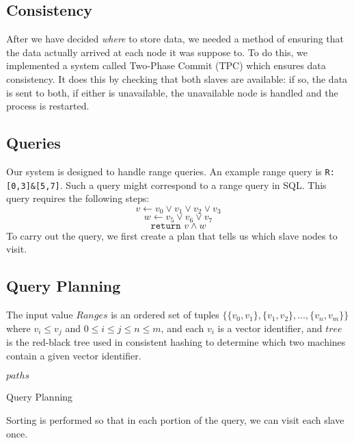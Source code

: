 \subsection{Consistency}
After we have decided \emph{where} to store data, we needed a method of ensuring that the data actually arrived at each node it was suppose to.
To do this, we implemented a system called Two-Phase Commit (TPC) which ensures data consistency.
It does this by checking that both slaves are available: if so, the data is sent to both, if either is unavailable, the unavailable node is handled and the process is restarted.
%
\subsection{Queries}
Our system is designed to handle range queries. An example range query is
\texttt{R:[0,3]\&[5,7]}. Such a query might correspond to a range query in SQL.
This query requires the following steps:
$$
v\gets v_0 \lor v_1 \lor v_2 \lor v_3 $$ $$
w\gets v_5 \lor v_6 \lor v_7 $$ $$
\texttt{return }  v \land w
$$
To carry out the query, we first create a plan that tells us which slave nodes
to visit.
\subsection{Query Planning}
The input value $Ranges$ is an ordered set of tuples $\{\{v_0,v_1\},\{v_1,v_2\},\ldots,\{v_n,v_m\}\}$ where $v_i\leq v_j$ and $0\leq i\leq j\leq n\leq m$, and each $v_i$ is a vector identifier, and $tree$ is the red-black tree used in
consistent hashing to determine which two machines contain a given vector identifier.

\begin{algorithm}
    \begin{algorithmic}
                  \Else
                  \EndIf
                \EndFor
          \EndFor
          \Return $paths$
    \end{algorithmic}
    \caption{Query Planning}
\end{algorithm}
Sorting is performed so that in each portion of the query, we can visit each
slave once.
%
